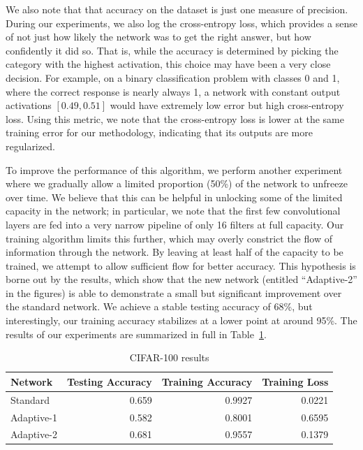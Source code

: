
We also note that that accuracy on the dataset is just one measure of precision.
During our experiments, we also log the cross-entropy loss, which provides a sense of not just how likely the network was to get the right answer, but how confidently it did so.
That is, while the accuracy is determined by picking the category with the highest activation, this choice may have been a very close decision.
For example, on a binary classification problem with classes 0 and 1, where the correct response is nearly always 1, a network with constant output activations $[0.49, 0.51]$ would have extremely low error but high cross-entropy loss.
Using this metric, we note that the cross-entropy loss is lower at the same training error for our methodology, indicating that its outputs are more regularized.

To improve the performance of this algorithm, we perform another experiment where we gradually allow a limited proportion (50\%) of the network to unfreeze over time.
We believe that this can be helpful in unlocking some of the limited capacity in the network; in particular, we note that the first few convolutional layers are fed into a very narrow pipeline of only 16 filters at full capacity.
Our training algorithm limits this further, which may overly constrict the flow of information through the network.
By leaving at least half of the capacity to be trained, we attempt to allow sufficient flow for better accuracy.
This hypothesis is borne out by the results, which show that the new network (entitled ``Adaptive-2'' in the figures) is able to demonstrate a small but significant improvement over the standard network.
We achieve a stable testing accuracy of 68\%, but interestingly, our training accuracy stabilizes at a lower point at around 95\%.
The results of our experiments are summarized in full in Table~\ref{table:cifar}.

\begin{table}[!htb]
\centering
\caption{CIFAR-100 results}
\label{table:cifar}
\begin{tabular}{@{}lrrr@{}}
\toprule
Network    & Testing Accuracy & Training Accuracy & Training Loss \\ \midrule
Standard   & 0.659            & 0.9927            & 0.0221        \\
Adaptive-1 & 0.582            & 0.8001            & 0.6595        \\
Adaptive-2 & 0.681            & 0.9557            & 0.1379        \\ \bottomrule
\end{tabular}
\end{table}


